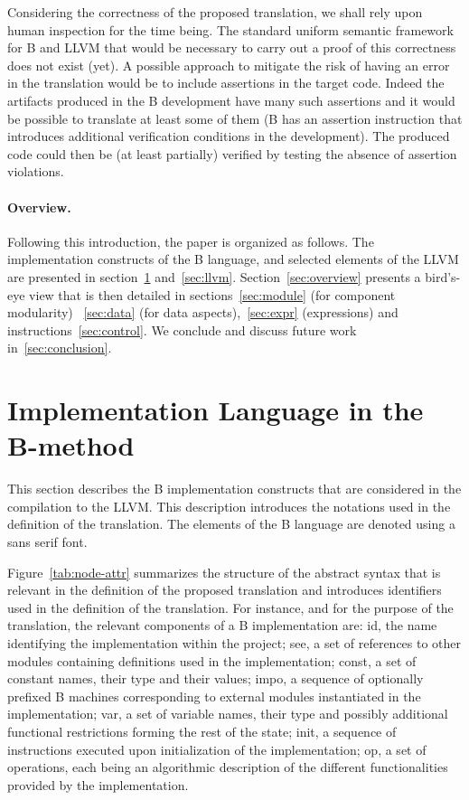 \documentclass{llncs}
\newcommand{\B}[1]{\textsf{#1}}
\begin{document}
Considering the correctness of the proposed translation, we shall rely upon
human inspection for the time being. The standard uniform semantic framework for
B and LLVM that would be necessary to carry out a proof of this correctness does
not exist (yet). A possible approach to mitigate the risk of having an error in
the translation would be to include assertions in the target code. Indeed the
artifacts produced in the B development have many such assertions and it would
be possible to translate at least some of them (B has an assertion instruction
that introduces additional verification conditions in the development). The
produced code could then be (at least partially) verified by testing the absence
of assertion violations.

\paragraph{Overview.} Following this introduction, the paper is organized as
follows. The implementation constructs of the B language, and selected elements
of the LLVM are presented in section~\ref{sec:b-impl}
and~\ref{sec:llvm}. Section~\ref{sec:overview} presents a bird's-eye view that
is then detailed in sections~\ref{sec:module} (for component modularity)
~\ref{sec:data} (for data aspects),~\ref{sec:expr} (expressions) and
instructions~\ref{sec:control}. We conclude and discuss future work
in~\ref{sec:conclusion}.

\section{Implementation Language in the B-method}
\label{sec:b-impl}

This section describes the B implementation constructs that are considered in
the compilation to the LLVM. This description introduces the notations used in
the definition of the translation. The elements of the B language are denoted
using a \B{sans serif} font. 

Figure~\ref{tab:node-attr} summarizes the structure
of the abstract syntax that is relevant in the definition of the proposed
translation and introduces identifiers used in the definition of the
translation. For instance, and for the purpose of the translation, the relevant
components of a B implementation are: \B{id}, the name identifying the
implementation within the project; \B{see}, a set of references to other modules
containing definitions used in the implementation; \B{const}, a set of constant
names, their type and their values; \B{impo}, a sequence of optionally
prefixed B machines corresponding to external modules instantiated in the
implementation; \B{var}, a set of variable names, their type and possibly
additional functional restrictions forming the rest of the state; \B{init}, a
sequence of instructions executed upon initialization of the implementation;
\B{op}, a set of operations, each being an algorithmic description of the
different functionalities provided by the implementation.
\end{document}

